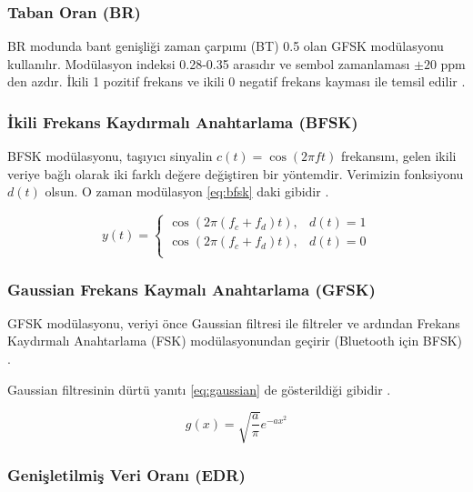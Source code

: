 \subsubsection{Taban Oran (BR)}

BR modunda bant genişliği zaman çarpımı (BT) 0.5 olan GFSK modülasyonu kullanılır. Modülasyon indeksi 0.28-0.35 arasıdır ve sembol zamanlaması $\pm20$ ppm den azdır. İkili 1 pozitif frekans ve ikili 0 negatif frekans kayması ile temsil edilir \cite{bluetooth2007core}.

\subsubsection{İkili Frekans Kaydırmalı Anahtarlama (BFSK)}

BFSK modülasyonu, taşıyıcı sinyalin $c(t)= \cos(2\pi f t)$ frekansını, gelen ikili veriye bağlı olarak iki farklı değere değiştiren bir yöntemdir. Verimizin fonksiyonu $d(t)$ olsun. O zaman modülasyon \eqref{eq:bfsk} daki gibidir \cite{BFSK}.

\begin{equation}
    y(t)=
    \begin{cases}
        \cos(2\pi (f_c+ f_d)t), & d(t)=1 \\
        \cos(2\pi( f_c+ f_d)t), &  d(t)=0 \\
    \end{cases}
    \label{eq:bfsk}
\end{equation}

\subsubsection{Gaussian Frekans Kaymalı Anahtarlama (GFSK)}

GFSK modülasyonu, veriyi önce Gaussian filtresi ile filtreler ve ardından 
Frekans Kaydırmalı Anahtarlama (FSK) modülasyonundan geçirir (Bluetooth için BFSK) \cite{bluetooth2007core}.

Gaussian filtresinin dürtü yanıtı \eqref{eq:gaussian} de gösterildiği gibidir \cite{gaussian}.

\begin{equation}
    g(x)= \sqrt{\frac{a}{\pi}}e^{-ax^2}
    \label{eq:gaussian}
\end{equation}


\subsubsection{Genişletilmiş Veri Oranı (EDR)}

